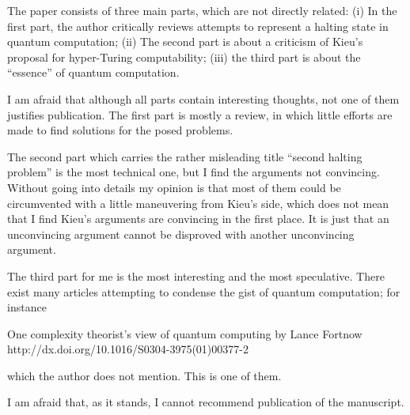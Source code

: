 \documentclass[prl,preprint,amsfonts]{revtex4}
\begin{document}
The paper consists of three main parts, which are not directly related:
(i) In the first part, the author critically reviews attempts to represent a halting state in quantum computation;
(ii) The second part is about a criticism of Kieu's proposal for hyper-Turing computability;
(iii) the third part is about the ``essence'' of quantum computation.

I am afraid that although all parts contain interesting thoughts,
not one of them justifies publication.
The first part is mostly a review,
in which little efforts are made to find solutions for the posed problems.

The second part which carries the rather misleading
title ``second halting problem'' is the most technical one,
but I find the arguments not convincing.
Without going into details my opinion is that
most of them could be circumvented with a little maneuvering from Kieu's side,
which does not mean that I find Kieu's arguments are convincing in the first place.
It is just that an unconvincing argument cannot be disproved with another unconvincing argument.

The third part for me is the most interesting and the most speculative.
There exist many articles attempting to condense the gist of quantum computation;
for instance

One complexity theorist's view of quantum computing
by Lance Fortnow
http://dx.doi.org/10.1016/S0304-3975(01)00377-2

which the author does not mention. This is one of them.

I am afraid that, as it stands, I cannot recommend publication of the manuscript.
\end{document}
